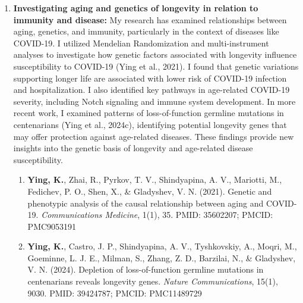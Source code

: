 \documentclass{nihbiosketch}
\begin{document}
\begin{enumerate}
\begin{enumerate}
\item \textbf{Ying, K.}, Tyshkovskiy, A., Chen, Q., Latorre-Crespo, E., Zhang, B., Liu, H., Matei-Dediu, B., Poganik, J. R., Moqri, M., Kirschner, K., Lasky-Su, J., \& Gladyshev, V. N. (2024). High-dimensional Ageome Representations of Biological Aging across Functional Modules. \textit{bioRxiv}. PMID: 39345525; PMCID: PMC11429788

\item V. N. Gladyshev, \textbf{K. Ying}, "High-dimensional measurement of biological age" (2024). \textit{Provisional Patent Application}

\end{enumerate}


\item \textbf{Investigating aging and genetics of longevity in relation to immunity and disease:} 
My research has examined relationships between aging, genetics, and immunity, particularly in the context of diseases like COVID-19. I utilized Mendelian Randomization and multi-instrument analyses to investigate how genetic factors associated with longevity influence susceptibility to COVID-19 (Ying et al., 2021). I found that genetic variations supporting longer life are associated with lower risk of COVID-19 infection and hospitalization. I also identified key pathways in age-related COVID-19 severity, including Notch signaling and immune system development. In more recent work, I examined patterns of loss-of-function germline mutations in centenarians (Ying et al., 2024c), identifying potential longevity genes that may offer protection against age-related diseases. These findings provide new insights into the genetic basis of longevity and age-related disease susceptibility.

\begin{enumerate}

\item \textbf{Ying, K.}, Zhai, R., Pyrkov, T. V., Shindyapina, A. V., Mariotti, M., Fedichev, P. O., Shen, X., \& Gladyshev, V. N. (2021). Genetic and phenotypic analysis of the causal relationship between aging and COVID-19. \textit{Communications Medicine}, 1(1), 35. PMID: 35602207; PMCID: PMC9053191

\item \textbf{Ying, K.}, Castro, J. P., Shindyapina, A. V., Tyshkovskiy, A., Moqri, M., Goeminne, L. J. E., Milman, S., Zhang, Z. D., Barzilai, N., \& Gladyshev, V. N. (2024). Depletion of loss-of-function germline mutations in centenarians reveals longevity genes. \textit{Nature Communications}, 15(1), 9030. PMID: 39424787; PMCID: PMC11489729


\end{enumerate}
\end{enumerate}
\end{document}
